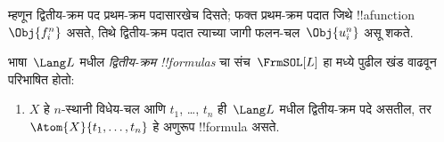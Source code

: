 \documentclass[../../../include/open-logic-section]{subfiles}
\begin{document}
\begin{explain}
म्हणून द्वितीय-क्रम
पद प्रथम-क्रम
पदासारखेच दिसते;
फक्त प्रथम-क्रम
पदात जिथे
!!a{function}~$\Obj{f^n_i}$
असते, तिथे
द्वितीय-क्रम
पदात त्याच्या
जागी फलन-चल~$\Obj{u^n_i}$
असू शकते.
\end{explain}

\begin{defn}
भाषा~$\Lang L$
मधील \emph{द्वितीय-क्रम
!!{formula}s} चा
संच~$\FrmSOL[L]$
हा 
मध्ये पुढील
खंड वाढवून
परिभाषित होतो:
\begin{enumerate}
\item $X$ हे
  $n$-स्थानी
  विधेय-चल
  आणि $t_1$,
  \dots, $t_n$
  ही~$\Lang L$
मधील द्वितीय-क्रम
पदे असतील, तर
  $\Atom{X}{t_1,\ldots, t_n}$
  हे अणुरूप
  !!{formula}
  असते.




\end{enumerate}
\end{defn}
\end{document}
